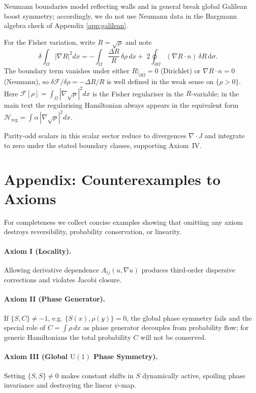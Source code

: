 \documentclass[11pt,a4paper]{article}
\numberwithin{equation}{section}
\theoremstyle{thmcompact}
\theoremstyle{remark}
\begin{document}
Neumann boundaries model reflecting walls and in general break global
Galilean boost symmetry; accordingly, we do not use Neumann data in the Bargmann algebra check of Appendix \ref{app:galilean}.

For the Fisher variation, write $R=\sqrt\rho$ and note
\[
\delta\!\int_\Omega |\nabla R|^{2}dx
= -\!\int_\Omega \frac{\Delta R}{R}\,\delta\rho\,dx
+\;2\!\oint_{\partial\Omega} (\nabla R\!\cdot\!n)\,\delta R\,\mathrm d\sigma.
\]
The boundary term vanishes under either $R|_{\partial\Omega}=0$ (Dirichlet) or $\nabla R\!\cdot\!n=0$ (Neumann), so $\delta\mathcal F/\delta\rho=-\Delta R/R$ is well defined in the weak sense on $\{\rho>0\}$. Here $\mathcal F[\rho]=\int_\Omega|\nabla\sqrt\rho|^2dx$ is the Fisher regulariser in the $R$-variable; in the main text the regularising Hamiltonian always appears in the equivalent form $\mathcal H_{\mathrm{reg}}=\int \alpha\,|\nabla\sqrt\rho|^{2}dx$.

Parity-odd scalars in this scalar sector reduce to divergences $\nabla\!\cdot J$ and integrate to zero under the stated boundary classes, supporting Axiom~IV.

	\section{Appendix: Counterexamples to Axioms}
	\label{app:counterexamples}
	
	For completeness we collect concise examples showing that omitting any
	axiom destroys reversibility, probability conservation, or linearity.
	
	\paragraph{Axiom I (Locality).}
	Allowing derivative dependence \(A_{ij}(u,\nabla u)\) produces
	third-order dispersive corrections and violates Jacobi closure.
	
	\paragraph{Axiom II (Phase Generator).}
	If \(\{S,C\}\neq -1\), e.g.
	\(\{S(x),\rho(y)\}=0\),
	the global phase symmetry fails and the special role of
	\(C=\!\int\rho\,dx\) as phase generator decouples from probability flow; for
	generic Hamiltonians the total probability \(C\) will not be conserved.
	
\paragraph{Axiom III (Global \(\mathrm{U}(1)\) Phase Symmetry).}
	Setting \(\{S,S\}\neq0\) makes constant shifts in \(S\) dynamically active,
	spoiling phase invariance and destroying the linear \(\psi\)-map.
	
\end{document}
